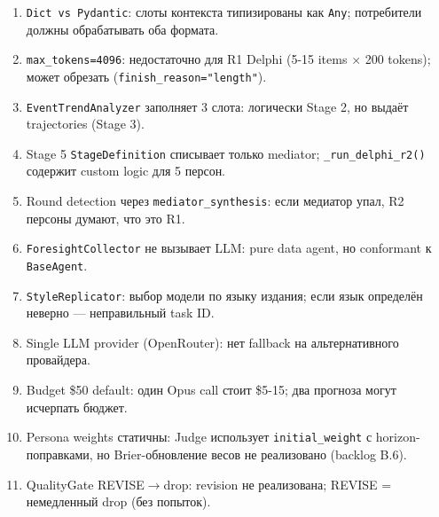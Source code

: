 \documentclass[a4paper, 11pt]{article}
\begin{document}
\begin{appendices}
\begin{enumerate}[nosep]
  \item \texttt{Dict vs Pydantic}: слоты контекста типизированы как \texttt{Any};
    потребители должны обрабатывать оба формата.
  \item \texttt{max\_tokens=4096}: недостаточно для R1 Delphi (5-15 items $\times$ 200 tokens);
    может обрезать (\texttt{finish\_reason="length"}).
  \item \texttt{EventTrendAnalyzer} заполняет 3 слота:
    логически Stage 2, но выдаёт trajectories (Stage 3).
  \item Stage 5 \texttt{StageDefinition} списывает только mediator;
    \texttt{\_run\_delphi\_r2()} содержит custom logic для 5 персон.
  \item Round detection через \texttt{mediator\_synthesis}:
    если медиатор упал, R2 персоны думают, что это R1.
  \item \texttt{ForesightCollector} не вызывает LLM:
    pure data agent, но conformant к \texttt{BaseAgent}.
  \item \texttt{StyleReplicator}: выбор модели по языку издания;
    если язык определён неверно --- неправильный task ID.
  \item Single LLM provider (OpenRouter):
    нет fallback на альтернативного провайдера.
  \item Budget \$50 default:
    один Opus call стоит \$5-15; два прогноза могут исчерпать бюджет.
  \item Persona weights статичны:
    Judge использует \texttt{initial\_weight} с horizon-поправками,
    но Brier-обновление весов не реализовано (backlog B.6).
  \item QualityGate REVISE$\to$drop:
    revision не реализована; REVISE = немедленный drop (без попыток).
\end{enumerate}

\end{appendices}

\end{document}
